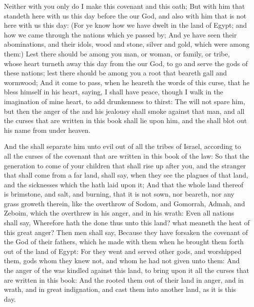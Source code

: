 \Verse Neither with you only do I make this covenant and this oath; \Verse But with him that standeth here with us this day before the \LORD our God, and also with him that is not here with us this day: \Verse (For ye know how we have dwelt in the land of Egypt; and how we came through the nations which ye passed by; \Verse And ye have seen their abominations, and their idols, wood and stone, silver and gold, which were among them:) \Verse Lest there should be among you man, or woman, or family, or tribe, whose heart turneth away this day from the \LORD our God, to go and serve the gods of these nations; lest there should be among you a root that beareth gall and wormwood; \Verse And it come to pass, when he heareth the words of this curse, that he bless himself in his heart, saying, I shall have peace, though I walk in the imagination of mine heart, to add drunkenness to thirst: \Verse The \LORD will not spare him, but then the anger of the \LORD and his jealousy shall smoke against that man, and all the curses that are written in this book shall lie upon him, and the \LORD shall blot out his name from under heaven.

\Verse And the \LORD shall separate him unto evil out of all the tribes of Israel, according to all the curses of the covenant that are written in this book of the law: \Verse So that the generation to come of your children that shall rise up after you, and the stranger that shall come from a far land, shall say, when they see the plagues of that land, and the sicknesses which the \LORD hath laid upon it; \Verse And that the whole land thereof is brimstone, and salt, and burning, that it is not sown, nor beareth, nor any grass groweth therein, like the overthrow of Sodom, and Gomorrah, Admah, and Zeboim, which the \LORD overthrew in his anger, and in his wrath: \Verse Even all nations shall say, Wherefore hath the \LORD done thus unto this land? what meaneth the heat of this great anger?  \Verse Then men shall say, Because they have forsaken the covenant of the \LORD God of their fathers, which he made with them when he brought them forth out of the land of Egypt: \Verse For they went and served other gods, and worshipped them, gods whom they knew not, and whom he had not given unto them: \Verse And the anger of the \LORD was kindled against this land, to bring upon it all the curses that are written in this book: \Verse And the \LORD rooted them out of their land in anger, and in wrath, and in great indignation, and cast them into another land, as it is this day.

